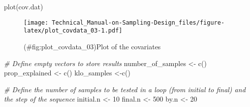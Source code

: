 \documentclass[
]{book}
\newenvironment{Shaded}{\begin{snugshade}}{\end{snugshade}}
\newcommand{\AttributeTok}[1]{\textcolor[rgb]{0.77,0.63,0.00}{#1}}
\newcommand{\CommentTok}[1]{\textcolor[rgb]{0.56,0.35,0.01}{\textit{#1}}}
\newcommand{\ConstantTok}[1]{\textcolor[rgb]{0.00,0.00,0.00}{#1}}
\newcommand{\DecValTok}[1]{\textcolor[rgb]{0.00,0.00,0.81}{#1}}
\newcommand{\DocumentationTok}[1]{\textcolor[rgb]{0.56,0.35,0.01}{\textbf{\textit{#1}}}}
\newcommand{\FunctionTok}[1]{\textcolor[rgb]{0.00,0.00,0.00}{#1}}
\newcommand{\NormalTok}[1]{#1}
\newcommand{\OtherTok}[1]{\textcolor[rgb]{0.56,0.35,0.01}{#1}}
\newcommand{\SpecialCharTok}[1]{\textcolor[rgb]{0.00,0.00,0.00}{#1}}
\newcommand{\StringTok}[1]{\textcolor[rgb]{0.31,0.60,0.02}{#1}}
\begin{document}
\begin{Shaded}
\end{Shaded}

\begin{Shaded}
\begin{Highlighting}[]
   \FunctionTok{plot}\NormalTok{(cov.dat)}
\end{Highlighting}
\end{Shaded}

\begin{figure}
\centering
\texttt{[image: Technical\_Manual-on-Sampling-Design\_files/figure-latex/plot\_covdata\_03-1.pdf]}
\caption{(\#fig:plot\_covdata\_03)Plot of the covariates}
\end{figure}

\begin{Shaded}
\begin{Highlighting}[]
  \CommentTok{\# Define empty vectors to store results}
\NormalTok{  number\_of\_samples }\OtherTok{\textless{}{-}} \FunctionTok{c}\NormalTok{()}
\NormalTok{  prop\_explained }\OtherTok{\textless{}{-}} \FunctionTok{c}\NormalTok{()}
\NormalTok{  klo\_samples }\OtherTok{\textless{}{-}}\FunctionTok{c}\NormalTok{()}
    
  \CommentTok{\# Define the number of samples to be tested in a loop (from initial to final) and the step of the sequence}
\NormalTok{  initial.n }\OtherTok{\textless{}{-}} \DecValTok{10}
\NormalTok{  final.n }\OtherTok{\textless{}{-}} \DecValTok{500}
\NormalTok{  by.n }\OtherTok{\textless{}{-}} \DecValTok{20}
\end{Highlighting}
\end{Shaded}
\end{document}

